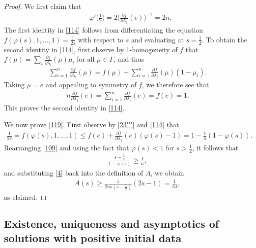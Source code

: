 \documentclass[12pt]{article}
\numberwithin{equation}{section}
\theoremstyle{plain}
\theoremstyle{definition}
\renewcommand{\phi}{\varphi}
\begin{document}
\begin{proof}
	We first claim that 
	\begin{align}\label{114}
	-\phi'\bigg(\frac{1}{2}\bigg)= 2\bigg(\frac{\partial f}{\partial \lambda_1}(e)\bigg)^{-1} = 2n.
	\end{align}
	The first identity in \eqref{114} follows from differentiating the equation $f(\phi(s),1,\dots,1) = \frac{1}{2s}$ with respect to $s$ and evaluating at $s=\frac{1}{2}$. To obtain the second identity in \eqref{114}, first observe by 1-homogeneity of $f$ that $f(\mu) = \sum_i\frac{\partial f}{\partial \lambda_i}(\mu)\mu_i$ for all $\mu\in\Gamma$, and thus
	\begin{align*}
	\sum_{i=1}^n \frac{\partial f}{\partial\lambda_i}(\mu) = f(\mu) +  \sum_{i=1}^n \frac{\partial f}{\partial \lambda_i}(\mu)(1-\mu_i). 
	\end{align*}
	Taking $\mu = e$ and appealing to symmetry of $f$, we therefore see that
	\begin{align*}
	n\frac{\partial f}{\partial \lambda_1}(e) = \sum_{i=1}^n \frac{\partial f}{\partial\lambda_i}(e) = f(e) = 1.
	\end{align*}
	This proves the second identity in \eqref{114}.  \medskip 
	
	We now prove \eqref{119}. First observe by \eqref{23'''} and \eqref{114} that
	\begin{align}\label{109}
	\frac{1}{2s} = f(\phi(s),1,\dots,1) \leq f(e)+ \frac{\partial f}{\partial \lambda_1}(e)(\phi(s) -1) = 1 - \frac{1}{n}(1-\phi(s)). 
	\end{align}
	Rearranging \eqref{109} and using the fact that $\phi(s)<1$ for $s>\frac{1}{2}$, it follows that 
	\begin{align}\label{4}
	\frac{s-\frac{1}{2}}{1-\phi(s)} \geq  \frac{s}{n},
	\end{align}
	and substituting \eqref{4} back into the definition of $A$, we obtain
	\begin{align*}
	A(s)  \geq \frac{1}{2ns(s-\frac{1}{2})}(2s-1) = \frac{1}{ns},
	\end{align*}
	as claimed. 
\end{proof}





\subsection{Existence, uniqueness and asymptotics of solutions with positive initial data}
\end{document}
